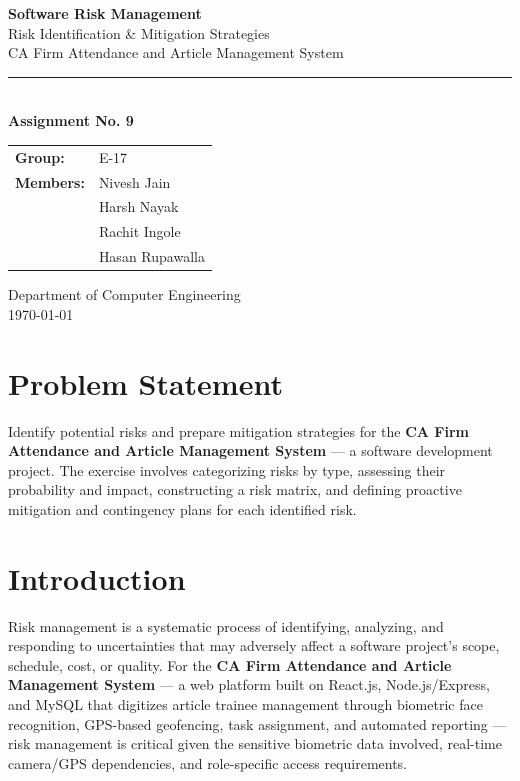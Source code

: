 \documentclass[12pt,a4paper]{article}
\begin{document}
\begin{titlepage}
\centering
\vspace*{2cm}
{\Huge\bfseries\color{headblue} Software Risk Management\\[12pt]}
{\LARGE Risk Identification \& Mitigation Strategies\\[8pt]}
{\large CA Firm Attendance and Article Management System\\[20pt]}
\rule{0.6\textwidth}{1pt}\\[20pt]

{\large\textbf{Assignment No. 9}}\\[30pt]

\begin{tabular}{ll}
\textbf{Group:} & E-17 \\[4pt]
\textbf{Members:} & Nivesh Jain \\
 & Harsh Nayak \\
 & Rachit Ingole \\
 & Hasan Rupawalla \\
\end{tabular}

\vfill
{\small Department of Computer Engineering\\
\today}
\end{titlepage}

\section{Problem Statement}
Identify potential risks and prepare mitigation strategies for the \textbf{CA Firm Attendance and Article Management System} --- a software development project. The exercise involves categorizing risks by type, assessing their probability and impact, constructing a risk matrix, and defining proactive mitigation and contingency plans for each identified risk.

\section{Introduction}
Risk management is a systematic process of identifying, analyzing, and responding to uncertainties that may adversely affect a software project's scope, schedule, cost, or quality. For the \textbf{CA Firm Attendance and Article Management System} --- a web platform built on React.js, Node.js/Express, and MySQL that digitizes article trainee management through biometric face recognition, GPS-based geofencing, task assignment, and automated reporting --- risk management is critical given the sensitive biometric data involved, real-time camera/GPS dependencies, and role-specific access requirements.
\end{document}
